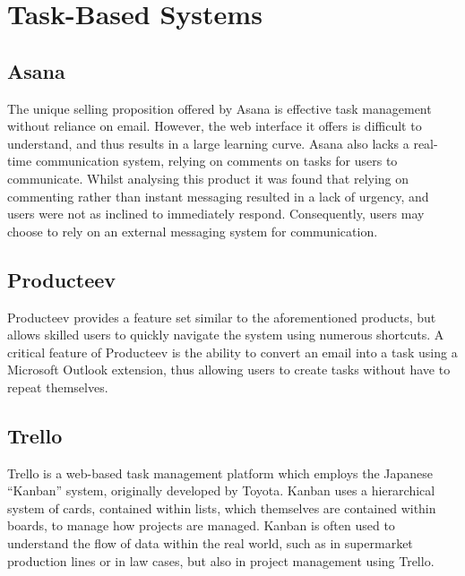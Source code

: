 \documentclass[a4paper]{l3proj}
\begin{document}
\section{Task-Based Systems}
\subsection{Asana}
\label{asana}

The unique selling proposition offered by Asana is effective task management without reliance on email. However, the web interface it offers is difficult to understand, and thus results in a large learning curve. Asana also lacks a real-time communication system, relying on comments on tasks for users to communicate. Whilst analysing this product it was found that relying on commenting rather than instant messaging resulted in a lack of urgency, and users were not as inclined to immediately respond. Consequently, users may choose to rely on an external messaging system for communication.

\subsection{Producteev}
\label{producteev}

Producteev provides a feature set similar to the aforementioned products, but allows skilled users to quickly navigate the system using numerous shortcuts. A critical feature of Producteev is the ability to convert an email into a task using a Microsoft Outlook extension, thus allowing users to create tasks without have to repeat themselves. 

\subsection{Trello}
\label{trello}

Trello is a web-based task management platform which employs the Japanese ``Kanban''
system, originally developed by Toyota. Kanban uses a hierarchical system of
cards, contained within lists, which themselves are contained within boards, to
manage how projects are managed. Kanban is often used to understand the flow of data within the real world, such as in supermarket production lines or in law cases, but also in project management using Trello.
\end{document}
